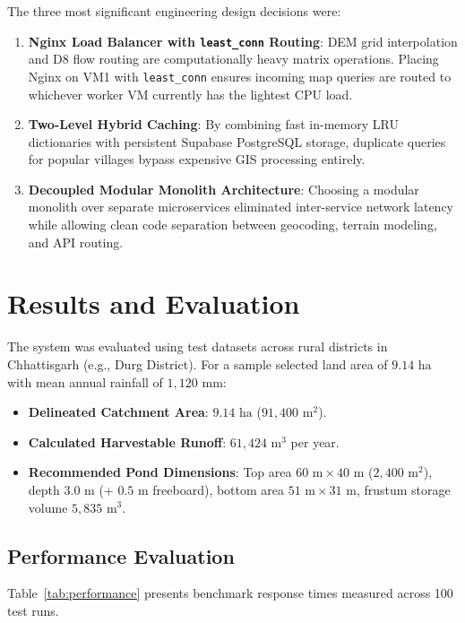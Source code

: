 \documentclass[manuscript,screen]{acmart}
\begin{document}
The three most significant engineering design decisions were:
\begin{enumerate}[leftmargin=*]
    \item \textbf{Nginx Load Balancer with \texttt{least\_conn} Routing}: DEM grid interpolation and D8 flow routing are computationally heavy matrix operations. Placing Nginx on VM1 with \texttt{least\_conn} ensures incoming map queries are routed to whichever worker VM currently has the lightest CPU load.
    \item \textbf{Two-Level Hybrid Caching}: By combining fast in-memory LRU dictionaries with persistent Supabase PostgreSQL storage, duplicate queries for popular villages bypass expensive GIS processing entirely.
    \item \textbf{Decoupled Modular Monolith Architecture}: Choosing a modular monolith over separate microservices eliminated inter-service network latency while allowing clean code separation between geocoding, terrain modeling, and API routing.
\end{enumerate}

\section{Results and Evaluation}
\label{sec:results}
The system was evaluated using test datasets across rural districts in Chhattisgarh (e.g., Durg District). For a sample selected land area of $9.14\text{ ha}$ with mean annual rainfall of $1,120\text{ mm}$:
\begin{itemize}[leftmargin=*]
    \item \textbf{Delineated Catchment Area}: $9.14\text{ ha}$ ($91,400\text{ m}^2$).
    \item \textbf{Calculated Harvestable Runoff}: $61,424\text{ m}^3$ per year.
    \item \textbf{Recommended Pond Dimensions}: Top area $60\text{ m} \times 40\text{ m}$ ($2,400\text{ m}^2$), depth $3.0\text{ m}$ (+ $0.5\text{ m}$ freeboard), bottom area $51\text{ m} \times 31\text{ m}$, frustum storage volume $5,835\text{ m}^3$.
\end{itemize}

\subsection{Performance Evaluation}
Table~\ref{tab:performance} presents benchmark response times measured across 100 test runs.
\end{document}
